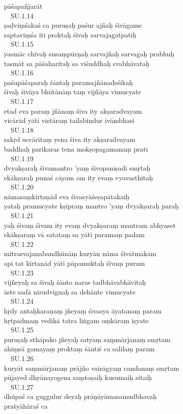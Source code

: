 \documentclass{tufte-handout}
\begin{document}
pāśapañjarāt\\\  \ SU.1.14\\ṣaḍviṃśakaś ca puruṣaḥ paśur ajñaḥ śivāgame\\saptaviṃśa iti proktaḥ śivaḥ sarvajagatpatiḥ\\\  \ SU.1.15\\yasmāc chivaḥ susaṃpūrṇaḥ sarvajñaḥ sarvagaḥ prabhuḥ\\tasmāt sa pāśaharitaḥ sa viśuddhaḥ svabhāvataḥ\\\  \ SU.1.16\\paśupāśaparaḥ śāntaḥ paramajñānadeśikaḥ\\śivaḥ śivāya bhūtānāṃ taṃ vijñāya vimucyate\\\  \ SU.1.17\\etad eva paraṃ jñānaṃ śiva ity akṣaradvayam\\vicārād yāti vistāraṃ tailabindur ivāmbhasi\\\  \ SU.1.18\\sakṛd uccāritaṃ yena śiva ity akṣaradvayam\\baddhaḥ parikaras tena mokṣopagamanaṃ prati\\\  \ SU.1.19\\dvyakṣaraḥ śivamantro 'yaṃ śivopaniṣadi smṛtaḥ\\ekākṣaraḥ punaś cāyam om ity evaṃ vyavasthitaḥ\\\  \ SU.1.20\\nāmasaṃkīrtaṇād eva śivasyāśeṣapātakaiḥ\\yataḥ pramucyate kṣipraṃ mantro 'yaṃ dvyakṣaraḥ paraḥ\\\  \ SU.1.21\\yaḥ śivaṃ śivam ity evaṃ dvyakṣaraṃ mantram abhyaset\\ekākṣaraṃ vā satataṃ sa yāti paramaṃ padam\\\  \ SU.1.22\\mitrasvajanabandhūnāṃ kuryān nāma śivātmakam\\api tat kīrtanād yāti pāpamuktaḥ śivaṃ puram\\\  \ SU.1.23\\vijñeyaḥ sa śivaḥ śānto naras tadbhāvabhāvitaḥ\\āste sadā nirudvignaḥ sa dehānte vimucyate\\\  \ SU.1.24\\hṛdy antaḥkaraṇaṃ jñeyaṃ śivasya āyatanaṃ param\\hṛtpadmaṃ vedikā tatra liṅgam oṃkāram iṣyate\\\  \ SU.1.25\\puruṣaḥ sthāpako jñeyaḥ satyaṃ saṃmārjanaṃ smṛtam\\ahiṃsā gomayaṃ proktaṃ śāntiś ca salilaṃ param\\\  \ SU.1.26\\kuryāt saṃmārjanaṃ prājño vairāgyaṃ candanaṃ smṛtam\\pūjayed dhyānayogena saṃtoṣaiḥ kusumaiḥ sitaiḥ\\\  \ SU.1.27\\dhūpaś ca guggulur deyaḥ prāṇāyāmasamudbhavaḥ\\pratyāhāraś ca 
\end{document}
